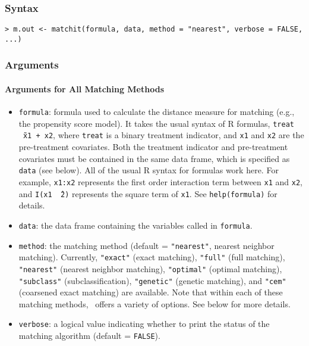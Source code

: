\subsubsection{Syntax}
\begin{verbatim}
> m.out <- matchit(formula, data, method = "nearest", verbose = FALSE, ...)
\end{verbatim}

\subsubsection{Arguments}

\paragraph{Arguments for All Matching Methods}

\begin{itemize}

\item \texttt{formula}: formula used to calculate the distance measure
  for matching (e.g., the propensity score model).  It takes the usual syntax of R formulas, {\tt treat
    \~\ x1 + x2}, where {\tt treat} is a binary treatment indicator,
  and {\tt x1} and {\tt x2} are the pre-treatment covariates. Both the
  treatment indicator and pre-treatment covariates must be contained
  in the same data frame, which is specified as {\tt data} (see
  below).  All of the usual R syntax for formulas work here. For
  example, {\tt x1:x2} represents the first order interaction term
  between {\tt x1} and {\tt x2}, and {\tt I(x1 \^\ 2)} represents the
  square term of {\tt x1}. See {\tt help(formula)} for details.
  
\item \texttt{data}: the data frame containing the variables called in
  {\tt formula}.  
  
\item \texttt{method}: the matching method (default =
  \texttt{"nearest"}, nearest neighbor matching).  Currently,
  \texttt{"exact"} (exact matching), \texttt{"full"} (full matching),
  \texttt{"nearest"} (nearest neighbor matching), \texttt{"optimal"}
  (optimal matching), \texttt{"subclass"} (subclassification),
  \texttt{"genetic"} (genetic matching), and \texttt{"cem"} (coarsened
  exact matching) are available. Note that within each of these
  matching methods, \MatchIt\ offers a variety of options. See below
  for more details.
  
\item \texttt{verbose}: a logical value indicating whether to print
  the status of the matching algorithm (default = \texttt{FALSE}).
\end{itemize}


